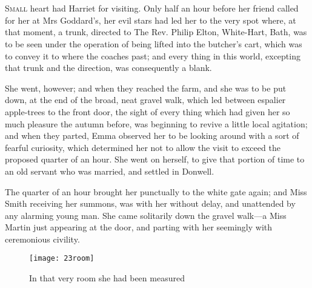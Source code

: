 \chapter[Chapter \thechapter]{}
\lettrine[lraise=0.3]{S}{mall} heart had Harriet for visiting. Only half an hour before her friend called for her at Mrs Goddard's, her evil stars had led her to the very spot where, at that moment, a trunk, directed to The Rev. Philip Elton, White-Hart, Bath, was to be seen under the operation of being lifted into the butcher's cart, which was to convey it to where the coaches past; and every thing in this world, excepting that trunk and the direction, was consequently a blank.

She went, however; and when they reached the farm, and she was to be put down, at the end of the broad, neat gravel walk, which led between espalier apple-trees to the front door, the sight of every thing which had given her so much pleasure the autumn before, was beginning to revive a little local agitation; and when they parted, Emma observed her to be looking around with a sort of fearful curiosity, which determined her not to allow the visit to exceed the proposed quarter of an hour. She went on herself, to give that portion of time to an old servant who was married, and settled in Donwell.

The quarter of an hour brought her punctually to the white gate again; and Miss Smith receiving her summons, was with her without delay, and unattended by any alarming young man. She came solitarily down the gravel walk—a Miss Martin just appearing at the door, and parting with her seemingly with ceremonious civility.

\begin{figure}[tbph]
\centering
\texttt{[image: 23room]}
\caption{In that very room she had been measured}
\end{figure}


